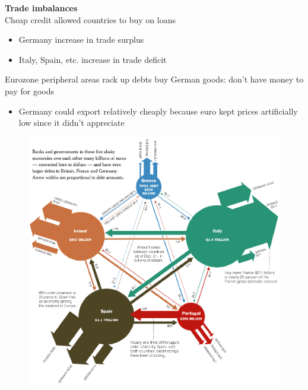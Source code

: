 \documentclass{beamer}
\begin{document}
\begin{frame}
  \textbf{Trade imbalances}\\
  Cheap credit allowed countries to buy on loans
  \begin{itemize}
    \item Germany increase in trade surplus
    \item Italy, Spain, etc. increase in trade deficit
  \end{itemize}
  \medskip
  Eurozone peripheral areas rack up debts buy German goods: don't have money to pay for goods  
  \begin{itemize}
    \item Germany could export relatively cheaply because euro kept prices artificially low since it didn't appreciate
  \end{itemize}
\end{frame}

\begin{frame}
  \begin{figure}
    \includegraphics[scale=.6]{debt_nyt.eps}
  \end{figure}
\end{frame}
\end{document}

